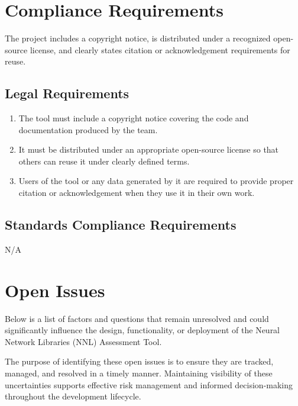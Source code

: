 \documentclass[12pt]{article}
\begin{document}
\section{Compliance Requirements}
The project includes a copyright notice, is distributed under a recognized open-source license, and clearly states citation or acknowledgement requirements for reuse.

\subsection{Legal Requirements}
\begin{enumerate}[label=CR-LR\arabic*]
\item The tool must include a copyright notice covering the code and documentation produced by the team.
\item It must be distributed under an appropriate open-source license so that others can reuse it under clearly defined terms.
\item Users of the tool or any data generated by it are required to provide proper citation or acknowledgement when they use it in their own work.
\end{enumerate}
\subsection{Standards Compliance Requirements}
N/A


\section{Open Issues}
Below is a list of factors and questions that remain unresolved and could significantly influence the design, functionality, or deployment of the Neural Network Libraries (NNL) Assessment Tool.

The purpose of identifying these open issues is to ensure they are tracked, managed, and resolved in a timely manner. Maintaining visibility of these uncertainties supports effective risk management and informed decision-making throughout the development lifecycle.
\end{document}
